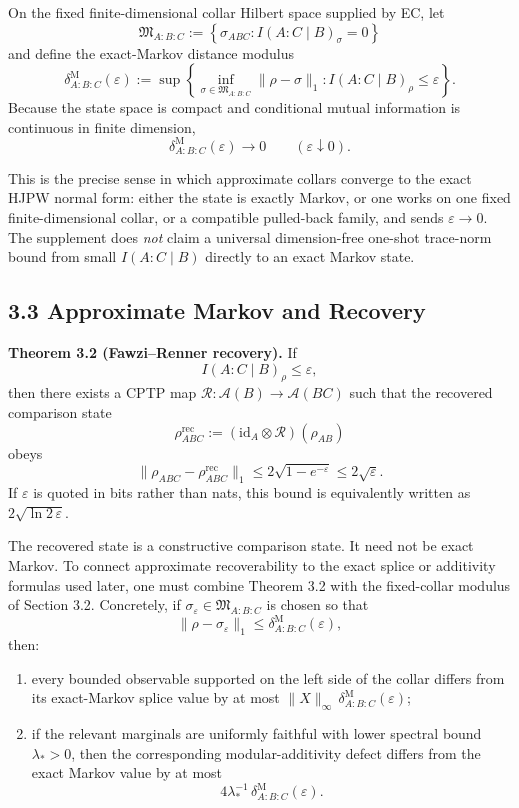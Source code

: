 On the fixed finite-dimensional collar Hilbert space supplied by EC, let
\[
\mathfrak M_{A:B:C}
:=
\left\{
\sigma_{ABC}: I(A:C\mid B)_\sigma=0
\right\}
\]
and define the exact-Markov distance modulus
\[
\delta^{\mathrm M}_{A:B:C}(\varepsilon)
:=
\sup\left\{
\inf_{\sigma\in\mathfrak M_{A:B:C}}\|\rho-\sigma\|_1:
I(A:C\mid B)_\rho\le\varepsilon
\right\}.
\]
Because the state space is compact and conditional mutual information is continuous in finite dimension,
\[
\delta^{\mathrm M}_{A:B:C}(\varepsilon)\longrightarrow0
\qquad
(\varepsilon\downarrow0).
\]

This is the precise sense in which approximate collars converge to the exact HJPW normal form: either the state is exactly Markov, or one works on one fixed finite-dimensional collar, or a compatible pulled-back family, and sends \(\varepsilon\to0\). The supplement does \emph{not} claim a universal dimension-free one-shot trace-norm bound from small \(I(A:C\mid B)\) directly to an exact Markov state.

\subsection{3.3 Approximate Markov and Recovery}\label{33-approximate-markov-and-recovery}

\textbf{Theorem 3.2 (Fawzi--Renner recovery).} If
\[
I(A:C\mid B)_\rho\le\varepsilon,
\]
then there exists a CPTP map \(\mathcal R:\mathcal A(B)\to\mathcal A(BC)\) such that the recovered comparison state
\[
\rho^{\mathrm{rec}}_{ABC}
:=
(\mathrm{id}_A\otimes\mathcal R)(\rho_{AB})
\]
obeys
\[
\|\rho_{ABC}-\rho^{\mathrm{rec}}_{ABC}\|_1
\le
2\sqrt{1-e^{-\varepsilon}}
\le
2\sqrt{\varepsilon}.
\]
If \(\varepsilon\) is quoted in bits rather than nats, this bound is equivalently written as \(2\sqrt{\ln 2\,\varepsilon}\).

The recovered state is a constructive comparison state. It need not be exact Markov. To connect approximate recoverability to the exact splice or additivity formulas used later, one must combine Theorem 3.2 with the fixed-collar modulus of Section 3.2. Concretely, if \(\sigma_\varepsilon\in\mathfrak M_{A:B:C}\) is chosen so that
\[
\|\rho-\sigma_\varepsilon\|_1
\le
\delta^{\mathrm M}_{A:B:C}(\varepsilon),
\]
then:
\begin{enumerate}
\item every bounded observable supported on the left side of the collar differs from its exact-Markov splice value by at most \(\|X\|_\infty\,\delta^{\mathrm M}_{A:B:C}(\varepsilon)\);
\item if the relevant marginals are uniformly faithful with lower spectral bound \(\lambda_\ast>0\), then the corresponding modular-additivity defect differs from the exact Markov value by at most
\[
4\lambda_\ast^{-1}\,
\delta^{\mathrm M}_{A:B:C}(\varepsilon).
\]
\end{enumerate}

